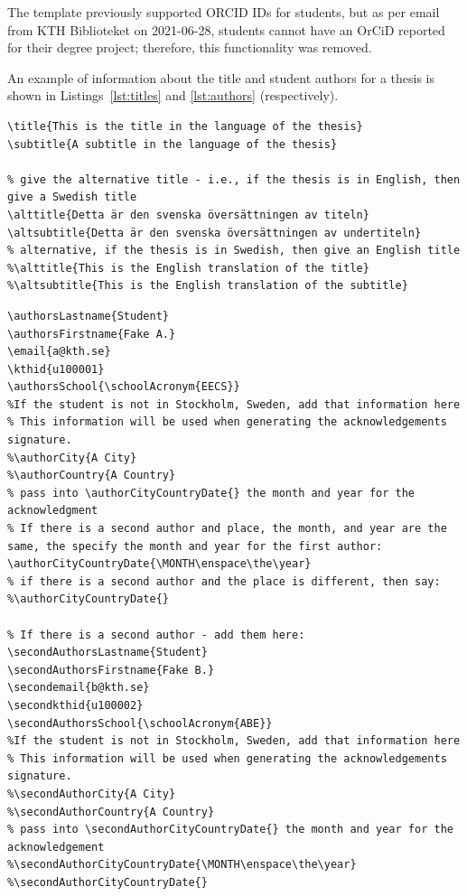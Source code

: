 The template previously supported ORCID IDs for students, but as per email from KTH Biblioteket on 2021-06-28, students cannot have an OrCiD reported for their degree project; therefore, this functionality was removed.


An example of information about the title and student authors for a thesis is shown in Listings~\ref{lst:titles} and \ref{lst:authors} (respectively).
\begin{lstlisting}[language={[LaTeX]TeX}, caption={Information about the titles and subtitles of the thesis}, label=lst:titles]
\title{This is the title in the language of the thesis}
\subtitle{A subtitle in the language of the thesis}

% give the alternative title - i.e., if the thesis is in English, then give a Swedish title
\alttitle{Detta är den svenska översättningen av titeln}
\altsubtitle{Detta är den svenska översättningen av undertiteln}
% alternative, if the thesis is in Swedish, then give an English title
%\alttitle{This is the English translation of the title}
%\altsubtitle{This is the English translation of the subtitle}
\end{lstlisting}
\begin{lstlisting}[language={[LaTeX]TeX}, caption={Information about the student authors of the thesis}, label=lst:authors] 
\authorsLastname{Student}
\authorsFirstname{Fake A.}
\email{a@kth.se}
\kthid{u100001}
\authorsSchool{\schoolAcronym{EECS}}
%If the student is not in Stockholm, Sweden, add that information here
% This information will be used when generating the acknowledgements signature.
%\authorCity{A City}
%\authorCountry{A Country}
% pass into \authorCityCountryDate{} the month and year for the acknowledgment
% If there is a second author and place, the month, and year are the same, the specify the month and year for the first author:
\authorCityCountryDate{\MONTH\enspace\the\year}
% if there is a second author and the place is different, then say:
%\authorCityCountryDate{}

% If there is a second author - add them here:
\secondAuthorsLastname{Student}
\secondAuthorsFirstname{Fake B.}
\secondemail{b@kth.se}
\secondkthid{u100002}
\secondAuthorsSchool{\schoolAcronym{ABE}}
%If the student is not in Stockholm, Sweden, add that information here
% This information will be used when generating the acknowledgements signature.
%\secondAuthorCity{A City}
%\secondAuthorCountry{A Country}
% pass into \secondAuthorCityCountryDate{} the month and year for the acknowledgement
%\secondAuthorCityCountryDate{\MONTH\enspace\the\year}
%\secondAuthorCityCountryDate{}
\end{lstlisting}


